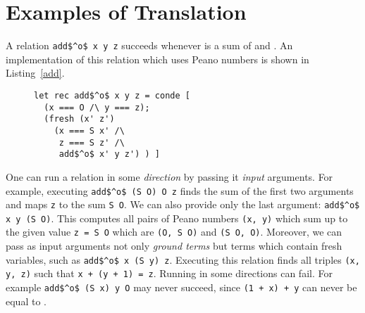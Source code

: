 \section{Examples of Translation}

A relation \lstinline{add$^o$ x y z} succeeds whenever \z is a sum of \x and \y.
An implementation of this relation which uses Peano numbers is shown in Listing~\ref{add}.

\begin{figure}[!t]
  \centering
  \begin{minipage}{\columnwidth}
    \begin{lstlisting}[label={add}, caption={Addition relation}, captionpos=b, frame=tb]
let rec add$^o$ x y z = conde [
  (x === O /\ y === z);
  (fresh (x' z')
    (x === S x' /\
     z === S z' /\
     add$^o$ x' y z') ) ]
    \end{lstlisting}
  \end{minipage}
\end{figure}

One can run a relation in some \emph{direction} by passing it \emph{input} arguments.
For example, executing \lstinline{add$^o$ (S O) O z} finds the sum of the first two arguments and maps \lstinline{z} to the sum \lstinline{S O}.
We can also provide only the last argument: \lstinline{add$^o$ x y (S O)}.
This computes all pairs of Peano numbers \lstinline{(x, y)} which sum up to the given value \lstinline{z = S O} which are \lstinline{(O, S O)} and \lstinline{(S O, O)}.
Moreover, we can pass as input arguments not only \emph{ground terms} but terms which contain fresh variables, such as \lstinline{add$^o$ x (S y) z}.
Executing this relation finds all triples \lstinline{(x, y, z)} such that \lstinline{x + (y + 1) = z}.
Running in some directions can fail.
For example \lstinline{add$^o$ (S x) y O} may never succeed, since \lstinline{(1 + x) + y} can never be equal to \zero.

